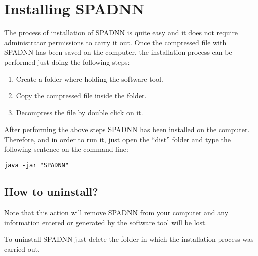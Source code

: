
\chapter{Installing SPADNN}

	\begin{onehalfspace}

		The process of installation of SPADNN is quite easy and it does not require administrator permissions to carry it out. Once the compressed file with SPADNN has been saved on the computer, the installation process can be performed just doing the following steps:
		
			\begin{enumerate}
			
				\item Create a folder where holding the software tool.
				\item Copy the compressed file inside the folder.
				\item Decompress the file by double click on it.

			\end{enumerate}
			
		After performing the above steps SPADNN has been installed on the computer. Therefore, and in order to run it, just open the ``dist'' folder and type the following sentence on the command line:
		
		\texttt{java -jar "SPADNN"}
			
			
		\section{How to uninstall?}
		
			Note that this action will remove SPADNN from your computer and any information entered or generated by the software tool will be lost.
			
			To uninstall SPADNN just delete the folder in which the installation process was carried out. 
		
	\end{onehalfspace}
